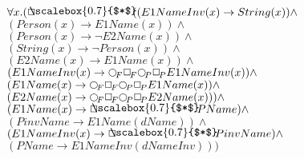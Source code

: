 \documentclass[a4paper,10pt]{article}
\begin{document}
 \newcommand{\nxt}{{\ensuremath\raisebox{0.25ex}{\text{\scriptsize$\bigcirc$}}}}
\newcommand{\Rdiamond}{\Diamond_{\!F}}
\newcommand{\Rbox}{\Box_{\!F}}
\newcommand{\Rnext}{\nxt_{\!F}}
\newcommand{\Ldiamond}{\Diamond_{\!P}}
\newcommand{\Lbox}{\Box_{\!P}}
\newcommand{\Lnext}{\nxt_{\!P}}
\newcommand{\SVdiamond}{\mathop{\ooalign{$\Diamond$ \cr \kern0.5ex
    \raisebox{0.35ex}{\scalebox{0.7}{$*$}}} \kern-0.9ex}}
\newcommand{\SVbox}{\mathop{\ooalign{$\Box$ \cr \kern0.42ex
    \raisebox{0.3ex}{\scalebox{0.7}{$*$}}} \kern-0.9ex}}


$ \forall x. ( \SVbox ((E1NameInv(x) \rightarrow String(x)) \land $ \\ 
 $ (Person(x) \rightarrow E1Name(x)) \land $ \\ 
 $ (Person(x) \rightarrow  \lnot E2Name(x)) \land $ \\ 
 $ (String(x) \rightarrow  \lnot Person(x)) \land $ \\ 
 $ (E2Name(x) \rightarrow E1Name(x)) \land $ \\ 
 $ (E1NameInv(x) \rightarrow  \Rnext  \Rbox  \Lnext  \Lbox E1NameInv(x)) \land $ \\ 
 $ (E1Name(x) \rightarrow  \Rnext  \Rbox  \Lnext  \Lbox E1Name(x)) \land $ \\ 
 $ (E2Name(x) \rightarrow  \Rnext  \Rbox  \Lnext  \Lbox E2Name(x))) \land $ \\ 
 $ (E1Name(x) \rightarrow  \SVbox PName) \land $ \\ 
 $ (PinvName \rightarrow E1Name(dName)) \land $ \\ 
 $ (E1NameInv(x) \rightarrow  \SVbox PinvName) \land $ \\ 
 $ (PName \rightarrow E1NameInv(dNameInv)))$ 
\end{document}
